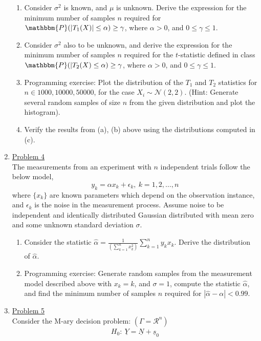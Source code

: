 \documentclass[a4paper,english,12pt]{article}
\newcommand{\ubar}[1]{\underline{#1}}
\begin{document}
\begin{enumerate}
\begin{enumerate}
\item Consider $\sigma^2$ is known, and $\mu$ is unknown. Derive the expression for the minimum number of samples $n$ required for $\mathbbm{P}(|T_1(X)|\leq\alpha)\geq \gamma$, where $\alpha>0$, and $0\leq \gamma \leq 1$.
\item Consider $\sigma^2$ also to be unknown, and derive the expression for the minimum number of samples $n$ required for the $t$-statistic defined in class $\mathbbm{P}(|T_2(X)\leq\alpha)\geq \gamma$, where $\alpha>0$, and $0\leq \gamma \leq 1$.
\item Programming exercise: Plot the distribution of the $T_1$ and $T_2$ statistics for $n\in {1000,10000,50000}$, for the case  $X_i\sim \mathcal{N}(2,2)$. (Hint: Generate several random samples of size $n$ from the given distribution and plot the histogram).
\item Verify the results from (a), (b) above using the distributions computed in (c).
\end{enumerate} 
\item \hyperlink{solution4}{Problem 4}\\
The measurements from an experiment with $n$ independent trials follow the below model,
\begin{equation*}
y_k=\alpha x_k + \epsilon_k,~k=1,2,\dots,n
\end{equation*}
where $\{x_k\}$ are known parameters which depend on the observation instance, and $\epsilon_k$ is the noise in the measurement process. Assume noise to be independent and identically distributed Gaussian distributed with mean zero and some unknown standard deviation $\sigma$. 
\begin{enumerate}
\item Consider the statistic ${\hat \alpha}=\frac{1}{\left(\sum\limits_{k=1}^{n} x_k^2\right)}\sum\limits_{k=1}^{n} y_kx_k$. Derive the distribution of ${\hat \alpha}$. 
\item Programming exercise: Generate random samples from the measurement model described above with $x_k=k$, and $\sigma=1$, compute the statistic ${\hat \alpha}$, and find the minimum number of samples $n$ required for $|{\hat \alpha}-\alpha|<0.99$.
\end{enumerate}
\item \hyperlink{solution5}{Problem 5}\\
Consider the M-ary decision problem: $(\Gamma=\mathcal{R}^n)$
\begin{eqnarray*}
H_0:~\ubar{Y}=\ubar{N}+\ubar{s}_0\\

\end{eqnarray*}
\end{enumerate}
\end{document}
